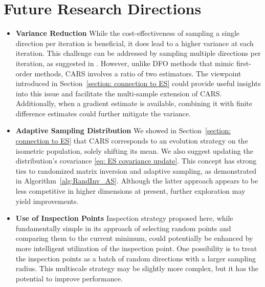 \section{Future Research Directions}
\begin{itemize}
    \item \textbf{Variance Reduction} While the cost-effectiveness of sampling a single direction per iteration is beneficial, it does lead to a higher variance at each iteration.
    This challenge can be addressed by sampling multiple directions per iteration, as suggested in \cite{liu2020primer}.
    However, unlike DFO methods that mimic first-order methods, CARS involves a ratio of two estimators. The viewpoint introduced in Section~\ref{section: connection to ES} could provide useful insights into this issue and facilitate the multi-sample extension of CARS. Additionally, when a gradient estimate is available, combining it with finite difference estimates could further mitigate the variance.
    \item \textbf{Adaptive Sampling Distribution} We showed in Section~\ref{section: connection to ES} that CARS corresponds to an evolution strategy on the isometric population, solely shifting its mean. We also suggest updating the distribution's covariance \eqref{eq: ES covariance update}. This concept has strong ties to randomized matrix inversion and adaptive sampling, as demonstrated in Algorithm~\ref{alg:RandInv_AS}. Although the latter approach appears to be less competitive in higher dimensions at present, further exploration may yield improvements.
    \item \textbf{Use of Inspection Points} Inspection strategy proposed here, while fundamentally simple in its approach of selecting random points and comparing them to the current minimum, could potentially be enhanced by more intelligent utilization of the inspection point. One possibility is to treat the inspection points as a batch of random directions with a larger sampling radius. This multiscale strategy may be slightly more complex, but it has the potential to improve performance.
\end{itemize}
